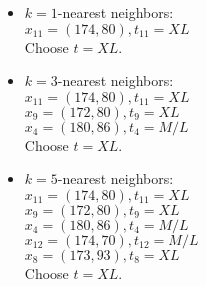 \documentclass{article}
\begin{document}
\begin{itemize}
    \item
        $k=1$-nearest neighbors:\\
        $x_{11}=(174,80), t_{11}=XL$\\
        Choose $t = XL$.\\
    \item
        $k=3$-nearest neighbors:\\
        $x_{11}=(174,80), t_{11}=XL$\\
        $x_9=(172,80), t_9=XL$\\
        $x_4=(180,86), t_4=M/L$\\
        Choose $t = XL$.\\
    \item
        $k=5$-nearest neighbors:\\
        $x_{11}=(174,80), t_{11}=XL$\\
        $x_9=(172,80), t_9=XL$\\
        $x_4=(180,86), t_4=M/L$\\
        $x_{12}=(174,70), t_{12}=M/L$\\
        $x_8=(173,93),t_8=XL$\\
        Choose $t = XL$.\\
\end{itemize}
\end{document}
